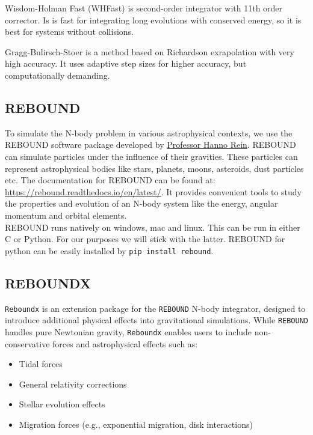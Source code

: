 \documentclass[12pt,a4paper]{article}
\begin{document}
Wisdom-Holman Fast (WHFast) is second-order integrator with 11th order corrector. Is is fast for integrating long evolutions with conserved energy, so it is best for systems without collisions.

Gragg-Bulirsch-Stoer is a method based on Richardson exrapolation with very high accuracy. It uses adaptive step sizes for higher accuracy, but computationally demanding.


\subsection{REBOUND}
To simulate the N-body problem in various astrophysical contexts, we use the REBOUND software package developed by \href{https://hanno-rein.de/}{ Professor Hanno Rein}. 
REBOUND can simulate particles under the influence of their gravities. These particles can represent astrophysical bodies like stars, planets, moons, asteroids, dust particles etc\cite{rebound}. 
The documentation for REBOUND can be found at: \href{https://rebound.readthedocs.io/en/latest/}{https://rebound.readthedocs.io/en/latest/}. It provides convenient tools to study the properties and evolution of an N-body system
like the energy, angular momentum and orbital elements. 
\\ REBOUND runs natively on windows, mac and linux. This can be run in either C or Python. For our purposes
we will stick with the latter. REBOUND for python can be easily installed by \texttt{pip install rebound}.

\subsection{REBOUNDX}
\texttt{Reboundx} is an extension package for the \texttt{REBOUND} N-body integrator, designed to introduce additional physical effects into gravitational simulations. While \texttt{REBOUND} handles pure Newtonian gravity, \texttt{Reboundx} enables users to include non-conservative forces and astrophysical effects such as:
\begin{itemize}
    \item Tidal forces
    \item General relativity corrections
    \item Stellar evolution effects
    \item Migration forces (e.g., exponential migration, disk interactions)
\end{itemize}
\end{document}
